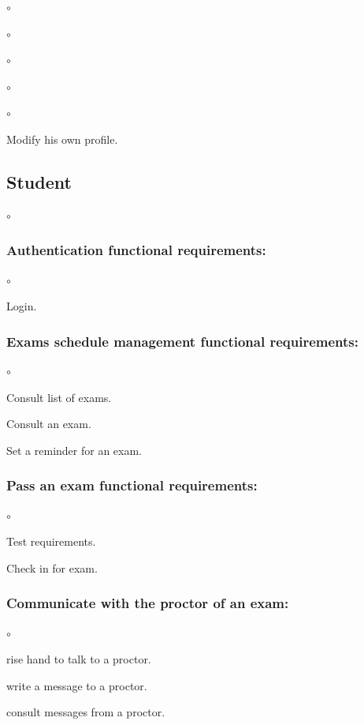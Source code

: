 \documentclass[]{uc2pfecaneva}
\begin{document}
\begin{list}{$\circ$}{}
\begin{list}{$\circ$}{}
\begin{list}{$\circ$}{}
\begin{list}{$\circ$}{}
\begin{list}{$\circ$}{}
        \item Modify his own profile.
    \end{list}

    \subsection{Student}
    \begin{list}{$\circ$}{}
        \subsubsection{Authentication functional requirements:}
        \begin{list}{$\circ$}{}
            \item Login.
        \end{list}

        \subsubsection{Exams schedule management functional requirements:}
        \begin{list}{$\circ$}{}
            \item Consult list of exams.
            \item Consult an exam.
            \item Set a reminder for an exam.
        \end{list}

        \subsubsection{Pass an exam functional requirements:}
        \begin{list}{$\circ$}{}
            \item Test requirements.
            \item Check in for exam.
            \subsubsection{Communicate with the proctor of an exam:}
            \begin{list}{$\circ$}{}
                \item rise hand to talk to a proctor.
                \item write a message to a proctor.
                \item consult messages from a proctor.
            \end{list}


\end{list}
\end{list}
\end{list}
\end{list}
\end{list}
\end{list}
\end{document}

